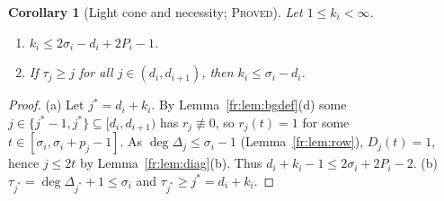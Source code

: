 \documentclass[11pt]{article}
\newtheorem{corollary}[theorem]{Corollary}
\theoremstyle{definition}
\theoremstyle{remark}
\newcommand{\PROVED}{\textsc{Proved}}
\begin{document}
\begin{corollary}[Light cone and necessity; \PROVED]\label{fr:cor:lightcone}
Let $1\le k_i<\infty$.
\begin{enumerate}
\item[(a)] $k_i\le2\sigma_i-d_i+2P_i-1$.
\item[(b)] If $\tau_j\ge j$ for all $j\in(d_i,d_{i+1})$, then $k_i\le\sigma_i-d_i$.
\end{enumerate}
\end{corollary}
\begin{proof}
(a) Let $j^*=d_i+k_i$. By Lemma~\ref{fr:lem:bgdef}(d) some $j\in\{j^*-1,j^*\}\subseteq[d_i,d_{i+1})$ has
$r_j\not\equiv0$, so $r_j(t)=1$ for some $t\in[\sigma_i,\sigma_i+p_j-1]$. As
$\deg\Delta_j\le\sigma_i-1$ (Lemma~\ref{fr:lem:row}), $D_j(t)=1$, hence $j\le2t$ by
Lemma~\ref{fr:lem:diag}(b). Thus $d_i+k_i-1\le2\sigma_i+2P_i-2$.
(b) $\tau_{j^*}=\deg\Delta_{j^*}+1\le\sigma_i$ and $\tau_{j^*}\ge j^*=d_i+k_i$.
\end{proof}
\end{document}
